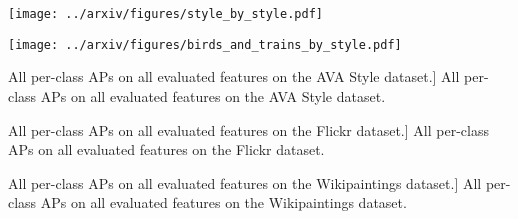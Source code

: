 







\begin{figure*}[ht]
\centering
\texttt{[image: ../arxiv/figures/style\_by\_style.pdf]}
\vspace{-1ex}
\caption{
    Cross-dataset style.
    On the left are shown top scorers from the Wikipaintings set, for styles learned on the Flickr set.
    On the right, Flickr photographs are accordingly sorted by Painting style.
    (Figure best viewed in color.)
}
\label{fig:photo_painting}
\end{figure*}

\begin{figure*}[hb]
\centering
\texttt{[image: ../arxiv/figures/birds\_and\_trains\_by\_style.pdf]}
\vspace{-1ex}
\caption{
Style-based search within the PASCAL dataset, showing the top 3 images with classifier ``bird" and ``train," in six Flickr styles and two Wikipaintings style.  Note that the PASCAL data includes only 773 bird images and 550 trains, and thus their stylistic range is limited.
(Figure best viewed in color.)
}
\label{fig:search_demo}
\end{figure*}


{\small


}

\pagebreak
\begin{table*}[h!]
\caption
[All per-class APs on all evaluated features on the AVA Style dataset.]
{All per-class APs on all evaluated features on the AVA Style dataset.}
\label{tab:ava_style_aps}
\centering
\small{

}
\end{table*}

\begin{table*}[h!]
\caption
[All per-class APs on all evaluated features on the Flickr dataset.]
{All per-class APs on all evaluated features on the Flickr dataset.}
\label{tab:flickr_aps}
\centering
\small{

}
\end{table*}

\begin{table*}[h!]
\centering
\caption
[All per-class APs on all evaluated features on the Wikipaintings dataset.]
{All per-class APs on all evaluated features on the Wikipaintings dataset.}
\label{tab:wikipaintings_aps}
\small{

}
\end{table*}
\pagebreak
